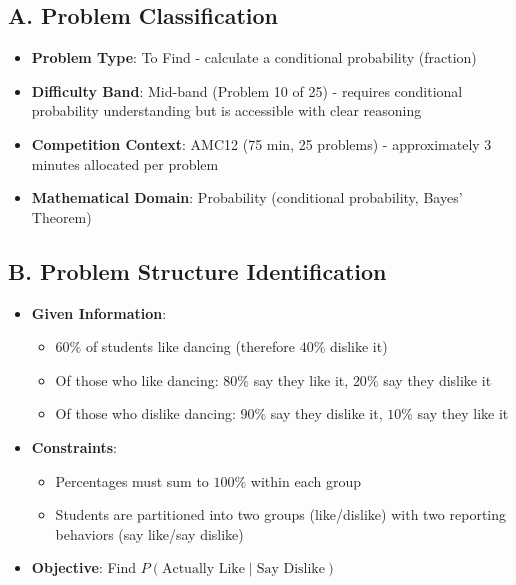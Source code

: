 \documentclass[]{article}
\begin{document}
\begin{problemconfigbox}
\subsection*{A. Problem Classification}
\begin{itemize}[leftmargin=*]
    \item \textbf{Problem Type}: To Find - calculate a conditional probability (fraction)
    \item \textbf{Difficulty Band}: Mid-band (Problem 10 of 25) - requires conditional probability understanding but is accessible with clear reasoning
    \item \textbf{Competition Context}: AMC12 (75 min, 25 problems) - approximately 3 minutes allocated per problem
    \item \textbf{Mathematical Domain}: Probability (conditional probability, Bayes' Theorem)
\end{itemize}

\subsection*{B. Problem Structure Identification}
\begin{itemize}[leftmargin=*]
    \item \textbf{Given Information}:
    \begin{itemize}
        \item $60\%$ of students like dancing (therefore $40\%$ dislike it)
        \item Of those who like dancing: $80\%$ say they like it, $20\%$ say they dislike it
        \item Of those who dislike dancing: $90\%$ say they dislike it, $10\%$ say they like it
    \end{itemize}
    
    \item \textbf{Constraints}:
    \begin{itemize}
        \item Percentages must sum to $100\%$ within each group
        \item Students are partitioned into two groups (like/dislike) with two reporting behaviors (say like/say dislike)
    \end{itemize}
    
    \item \textbf{Objective}: Find $P(\text{Actually Like} \mid \text{Say Dislike})$
    

\end{itemize}
\end{problemconfigbox}
\end{document}
